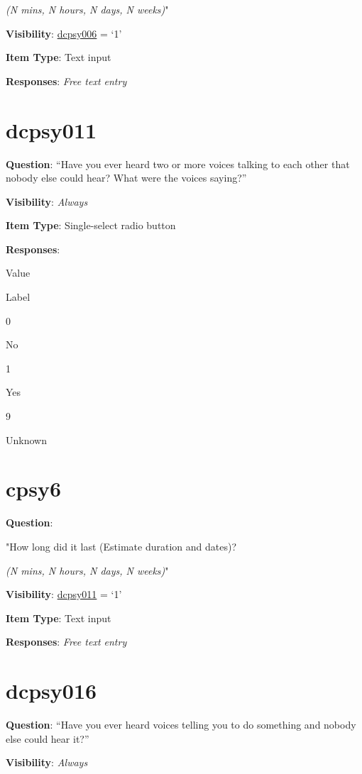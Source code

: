 \documentclass[]{book}
\begin{document}
\emph{(N mins, N hours, N days, N weeks)}"

\textbf{Visibility}: \protect\hyperlink{dcpsy006}{dcpsy006} = `1'

\textbf{Item Type}: Text input

\textbf{Responses}: \emph{Free text entry}

\hypertarget{dcpsy011}{%
\section{dcpsy011}\label{dcpsy011}}

\textbf{Question}: ``Have you ever heard two or more voices talking to each other that nobody else could hear? What were the voices saying?''

\textbf{Visibility}: \emph{Always}

\textbf{Item Type}: Single-select radio button

\textbf{Responses}:

Value

Label

0

No

1

Yes

9

Unknown

\hypertarget{cpsy6}{%
\section{cpsy6}\label{cpsy6}}

\textbf{Question}:

"How long did it last (Estimate duration and dates)?

\emph{(N mins, N hours, N days, N weeks)}"

\textbf{Visibility}: \protect\hyperlink{dcpsy011}{dcpsy011} = `1'

\textbf{Item Type}: Text input

\textbf{Responses}: \emph{Free text entry}

\hypertarget{dcpsy016}{%
\section{dcpsy016}\label{dcpsy016}}

\textbf{Question}: ``Have you ever heard voices telling you to do something and nobody else could hear it?''

\textbf{Visibility}: \emph{Always}
\end{document}
